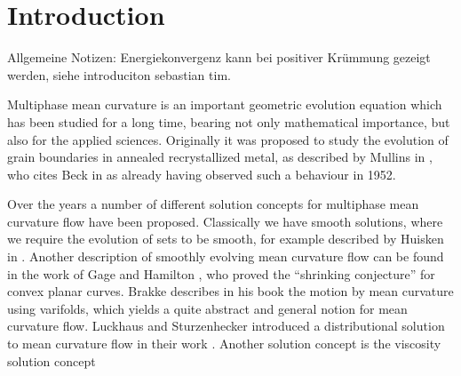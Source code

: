 \chapter{Introduction}

Allgemeine Notizen: Energiekonvergenz kann bei positiver Krümmung gezeigt 
werden, siehe introduciton sebastian tim.

Multiphase mean curvature is an important geometric evolution equation which 
has been studied for a long time, bearing not only mathematical importance, but 
also for the applied sciences. Originally it was proposed to study the 
evolution of grain boundaries in annealed recrystallized metal, as described by
Mullins in \cite{mullins_two_dimensional_motion_of_idealized_grain_boundaries}, 
who cites Beck in \cite{beck_metal_interfaces} as already having observed such 
a behaviour in 1952. 

Over the years a number of different solution concepts for multiphase mean 
curvature flow have been proposed. Classically we have smooth solutions, where 
we require the evolution of sets to be smooth, for example described by Huisken 
in \cite{huisken_asymptotic_behavior_for_singuliarities_of_mcf}. 
Another description of smoothly evolving mean curvature flow can be found in 
the work of Gage and Hamilton 
\cite{gage_hamilton_the_heat_equation_shrinking_convex_plane_curves}, who 
proved the \enquote{shrinking conjecture} for convex planar curves.
Brakke describes in his book 
\cite{brakke_kenneth_motion_of_surface_by_mean_curvature} the motion by mean 
curvature using varifolds, which yields a quite abstract and general notion for 
mean curvature flow. 
Luckhaus and Sturzenhecker introduced a 
distributional solution to mean curvature flow in their work 
\cite{luckhaus_sturzenhecker_implicit_time_discretization_for_mcf}. Another 
solution concept is the viscosity solution concept